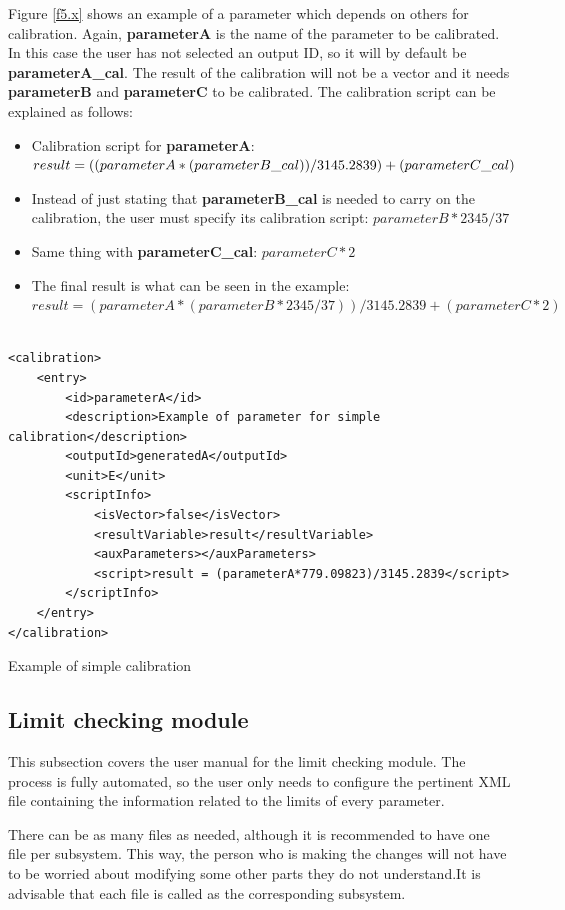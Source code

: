 Figure \ref{f5.x} shows an example of a parameter which depends on others for calibration. Again, \textbf{parameterA} is the name of the parameter to be calibrated. In this case the user has not selected an output ID, so it will by default be \textbf{parameterA\_cal}. The result of the calibration will not be a vector and it needs \textbf{parameterB} and \textbf{parameterC} to be calibrated. The calibration script can be explained as follows:
\begin{itemize}
\item Calibration script for \textbf{parameterA}: $result = ((parameterA*(parameterB\_cal))\\			/3145.2839) + (parameterC\_cal)$
\item Instead of just stating that \textbf{parameterB\_cal} is needed to carry on the calibration, the user must specify its calibration script: $parameterB*2345/37$
\item Same thing with \textbf{parameterC\_cal}: $parameterC*2$
\item The final result is what can be seen in the example: $result = (parameterA*(parameterB*2345/37))/3145.2839 + (parameterC*2)$
\end{itemize}
\begin{table}[H]
\lstset{language=XML}
\begin{lstlisting}

<calibration>
	<entry>
		<id>parameterA</id>
		<description>Example of parameter for simple calibration</description>
		<outputId>generatedA</outputId>
		<unit>E</unit>
		<scriptInfo>
			<isVector>false</isVector>
			<resultVariable>result</resultVariable>
			<auxParameters></auxParameters>
			<script>result = (parameterA*779.09823)/3145.2839</script>
		</scriptInfo>
	</entry>
</calibration>
\end{lstlisting}
\caption{Example of simple calibration}
\label{Table5.x}
\end{table}


\subsection{Limit checking module}
This subsection covers the user manual for the limit checking module. The process is fully automated, so the user only needs to configure the pertinent XML file containing the information related to the limits of every parameter. 

There can be as many files as needed, although it is recommended to have one file per subsystem. This way, the person who is making the changes will not have to be worried about modifying some other parts they do not understand.It is advisable that each file is called as the corresponding subsystem.

